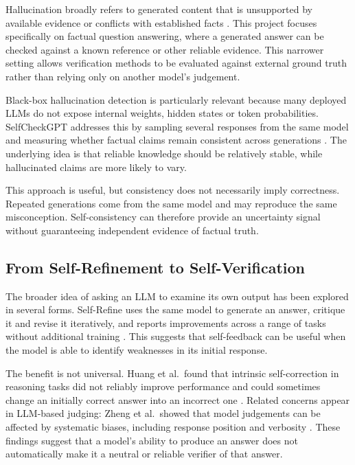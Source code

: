 \documentclass[11pt,a4paper]{article}
\begin{document}
	Hallucination broadly refers to generated content that is unsupported by available evidence or conflicts with established facts \cite{huang2025survey}. This project focuses specifically on factual question answering, where a generated answer can be checked against a known reference or other reliable evidence. This narrower setting allows verification methods to be evaluated against external ground truth rather than relying only on another model's judgement.
	
	Black-box hallucination detection is particularly relevant because many deployed LLMs do not expose internal weights, hidden states or token probabilities. SelfCheckGPT addresses this by sampling several responses from the same model and measuring whether factual claims remain consistent across generations \cite{manakul2023selfcheckgpt}. The underlying idea is that reliable knowledge should be relatively stable, while hallucinated claims are more likely to vary.
	
	This approach is useful, but consistency does not necessarily imply correctness. Repeated generations come from the same model and may reproduce the same misconception. Self-consistency can therefore provide an uncertainty signal without guaranteeing independent evidence of factual truth.
	
	\subsection{From Self-Refinement to Self-Verification}
	
	The broader idea of asking an LLM to examine its own output has been explored in several forms. Self-Refine uses the same model to generate an answer, critique it and revise it iteratively, and reports improvements across a range of tasks without additional training \cite{madaan2023selfrefine}. This suggests that self-feedback can be useful when the model is able to identify weaknesses in its initial response.
	
	The benefit is not universal. Huang et al.\ found that intrinsic self-correction in reasoning tasks did not reliably improve performance and could sometimes change an initially correct answer into an incorrect one \cite{huang2024selfcorrect}. Related concerns appear in LLM-based judging: Zheng et al.\ showed that model judgements can be affected by systematic biases, including response position and verbosity \cite{zheng2023judging}. These findings suggest that a model's ability to produce an answer does not automatically make it a neutral or reliable verifier of that answer.
	
\end{document}
